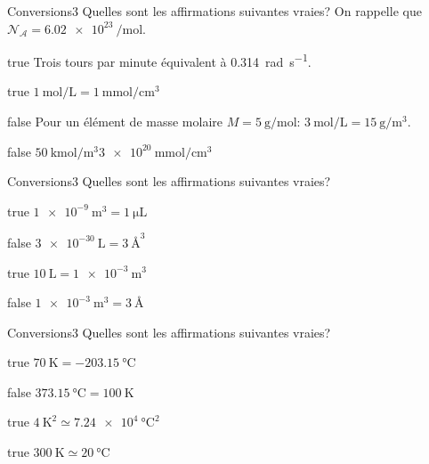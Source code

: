 \documentclass[11pt]{article}
\begin{document}
        \begin{question}{}{Conversions}{3}{}
            Quelles sont les affirmations suivantes vraies? On rappelle que $\mathcal{N_A} = \SI{6.02e23}{\per\mole}$.
        \end{question}
        \begin{reponses}
            \item[true] Trois tours par minute équivalent à \SI{0.314}{\radian\per\second}.
            \item[true] $\SI{1}{\mole\per\liter} = \SI{1}{\milli\mole\per\centi\meter\cubed}$
            \item[false] Pour un élément de masse molaire $M = \SI{5}{\gram\per\mole}$: $\SI{3}{\mole\per\liter} = \SI{15}{\gram\per\meter\cubed}$.
            \item[false] $\SI{50}{\kilo\mole\per\meter\cubed} \SI{3e20}{\milli\mole\per\centi\meter\cubed}$
        \end{reponses}
		
		\begin{question}{}{Conversions}{3}{}
            Quelles sont les affirmations suivantes vraies?
        \end{question}
        \begin{reponses}
            \item[true] $\SI{1e-9}{\meter\cubed} = \SI{1}{\micro\liter}$
            \item[false] $\SI{3e-30}{\liter} = \SI{3}{\angstrom\cubed}$
            \item[true] $\SI{10}{\liter} = \SI{1e-3}{\meter\cubed}$
            \item[false] $\SI{1e-3}{\meter\cubed} = \SI{3}{\angstrom}$
        \end{reponses}
        
        \begin{question}{}{Conversions}{3}{}
            Quelles sont les affirmations suivantes vraies?
        \end{question}
        \begin{reponses}
            \item[true] $\SI{70}{\kelvin} = \SI{-203.15}{\celsius}$
            \item[false] $\SI{373.15}{\celsius} = \SI{100}{\kelvin}$
            \item[true] $\SI{4}{\kelvin\squared} \simeq \SI{7.24e4}{\celsius\squared}$
            \item[true] $\SI{300}{\kelvin} \simeq \SI{20}{\celsius}$
        \end{reponses}
		
\end{document}
